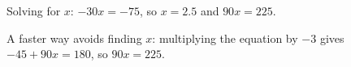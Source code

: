 Solving for $x$: $-30x=-75$, so $x=2.5$ and $90x=225$.

A faster way avoids finding $x$: multiplying the equation by $-3$ gives $-45+90x=180$, so $90x=\boxed{225}$.
